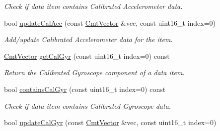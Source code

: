 \begin{DoxyCompactItemize}
\begin{DoxyCompactList}\small\item\em \-Check if data item contains \-Calibrated \-Accelerometer data. \end{DoxyCompactList}\item 
\hypertarget{classxsens_1_1Packet_a32901b0cafc1e913fd00242851a5fec6}{bool \hyperlink{classxsens_1_1Packet_a32901b0cafc1e913fd00242851a5fec6}{update\-Cal\-Acc} (const \hyperlink{structCmtVector}{\-Cmt\-Vector} \&vec, const uint16\-\_\-t index=0)}\label{classxsens_1_1Packet_a32901b0cafc1e913fd00242851a5fec6}

\begin{DoxyCompactList}\small\item\em \-Add/update \-Calibrated \-Accelerometer data for the item. \end{DoxyCompactList}\item 
\hyperlink{structCmtVector}{\-Cmt\-Vector} \hyperlink{classxsens_1_1Packet_ada610c07dbd6e2e4b663f0be8f5dc07d}{get\-Cal\-Gyr} (const uint16\-\_\-t index=0) const 
\begin{DoxyCompactList}\small\item\em \-Return the \-Calibrated \-Gyroscope component of a data item. \end{DoxyCompactList}\item 
\hypertarget{classxsens_1_1Packet_a379007ee995ee57a87baa5dd4c6a39ba}{bool \hyperlink{classxsens_1_1Packet_a379007ee995ee57a87baa5dd4c6a39ba}{contains\-Cal\-Gyr} (const uint16\-\_\-t index=0) const }\label{classxsens_1_1Packet_a379007ee995ee57a87baa5dd4c6a39ba}

\begin{DoxyCompactList}\small\item\em \-Check if data item contains \-Calibrated \-Gyroscope data. \end{DoxyCompactList}\item 
\hypertarget{classxsens_1_1Packet_ab868475748d85a85b125923cb59b1bfd}{bool \hyperlink{classxsens_1_1Packet_ab868475748d85a85b125923cb59b1bfd}{update\-Cal\-Gyr} (const \hyperlink{structCmtVector}{\-Cmt\-Vector} \&vec, const uint16\-\_\-t index=0)}\label{classxsens_1_1Packet_ab868475748d85a85b125923cb59b1bfd}


\end{DoxyCompactItemize}
